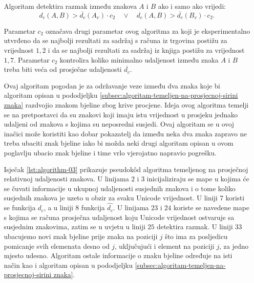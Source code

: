 \documentclass[times, utf8, zavrsni]{fer}
\begin{document}
Algoritam detektira razmak između znakova $A$ i $B$ ako i samo ako vrijedi:
\begin{equation}
\label{eq:relative-distance-03}
    d_c(A, B) > \overline{d_c}(A_v) \cdot c_2 \quad \lor \quad
    d_c(A, B) > \overline{d_c}(B_v) \cdot c_2 \texttt{.}
\end{equation}

Parametar $c_2$ označava drugi parametar ovog algoritma za koji je
eksperimentalno utvrđeno da se najbolji rezultati za sadržaj s računa iz
trgovina postižu za vrijednost $1{,}2$ i da se najbolji rezultati za sadržaj iz
knjiga postižu za vrijednost $1{,}7$. Parametar $c_2$ kontrolira koliko
minimalno udaljenost između znaka $A$ i $B$ treba biti veća od prosječne
udaljenosti $\overline{d_c}$.

Ovaj algoritam pogodan je za održavanje veze između dva znaka koje bi
algoritam opisan u pododjeljku
\ref{subsec:algoritam-temeljen-na-prosjecnoj-sirini znaka} razdvojio znakom
bjeline zbog krive procjene. Ideja ovog algoritma temelji se na
pretpostavci da su znakovi koji imaju istu vrijednost u prosjeku jednako
udaljeni od znakova s kojima su neposredni susjedi. Ovaj algoritam se u ovoj
inačici može koristiti kao dobar pokazatelj da između neka dva znaka zapravo
ne treba ubaciti znak bjeline iako bi možda neki drugi algoritam opisan u ovom
poglavlju ubacio znak bjeline i time vrlo vjerojatno napravio pogrešku.

Isječak \ref{lst:algorithm-03} prikazuje pseudokôd algoritma temeljenog na
prosječnoj relativnoj udaljenosti znakova. U linijama $2$ i $3$ inicijaliziraju
se mape u kojima će se čuvati informacije u ukupnoj udaljenosti susjednih
znakova i o tome koliko susjednih znakova je uzeto u obzir za svaku Unicode
vrijednost. U liniji $7$ koristi se funkcija $d_c$, a u liniji $8$ funkcija
$\hat{d_c}$. U linijama $23$ i $24$ koriste se navedene mape s kojima se računa
prosječna udaljenost koju Unicode vrijednost ostvaruje sa susjednim znakovima,
zatim se u uvjetu u liniji $25$ detektira razmak. U liniji $33$
ubacujemo novi znak bjeline prije znaka na poziciji $j$ što ima za posljedicu
pomicanje svih elemenata desno od $j$, uključujući i element na poziciji $j$,
za jedno mjesto udesno. Algoritam ostale informacije o znaku bjeline
određuje na isti način kao i algoritam opisan u pododjeljku
\ref{subsec:algoritam-temeljen-na-prosjecnoj-sirini znaka}.
\end{document}
